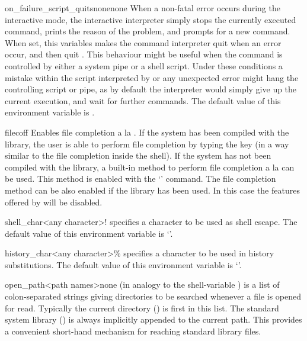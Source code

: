 \begin{nusmvVar} {on\_failure\_script\_quits}{none}{none}
When a non-fatal error occurs during the interactive mode, the
interactive interpreter simply stops the currently executed command,
prints the reason of the problem, and prompts for a new command.  When
set, this variables makes the command interpreter quit when an error
occur, and then quit \nusmv. This behaviour might be useful when the
command  is controlled by either a system pipe or
a shell script. Under these conditions a mistake within the script
interpreted by  or any unexpected error might
hang the controlling script or pipe, as by default the interpreter
would simply give up the current execution, and wait for further
commands. 
The default value of this environment variable is .
\end{nusmvVar}


\begin{nusmvVar}{filec}{}{off}
Enables file completion a la \csh.  If the system has been compiled
with the \nusmvreadline library, the user is able to perform file
completion by typing the \tab key (in a way similar to the file
completion inside the \bash shell). If the system has not been
compiled with the \nusmvreadline library, a built-in method to perform
file completion a la \csh can be used. This method is enabled with
the `' command. The \csh file completion method can
be also enabled if the \nusmvreadline library has been used. In this case
the features offered by \nusmvreadline will be disabled.
\end{nusmvVar}

\begin{nusmvVar}{shell\_char}{<any character>}{!}
 specifies a character to be used as shell escape.
The default value of this environment variable is `\varvalue{!}'.
\end{nusmvVar}

\begin{nusmvVar} {history\_char}{<any character>}{\%}
 specifies a character to be used in history
substitutions.
The default value of this environment variable is `\varvalue{\%}'.
\end{nusmvVar}

\begin{nusmvVar} {open\_path}{<path names>}{none}
 (in analogy to the shell-variable ) is a
list of colon-separated strings giving directories to be searched
whenever a file is opened for read. Typically the current directory
() is first in this list. The standard system library
(\stdsyslib) \vindex{\stdsyslib}
is always implicitly appended to the current path. This provides a
convenient short-hand mechanism for reaching standard library files.
\end{nusmvVar}

